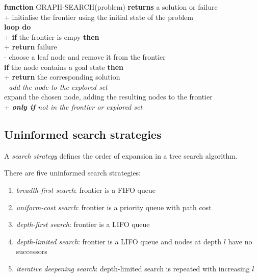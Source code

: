 \documentclass{article}
\begin{document}
\begin{pseudo}
\textbf{function} GRAPH-SEARCH(problem) \textbf{returns} a solution or failure  \\+
    initialise the frontier using the initial state of the problem              \\
    \textbf{loop do}                                                            \\+
        \textbf{if} the frontier is empy \textbf{then}                          \\+
            \textbf{return} failure                                             \\-
        choose a leaf node and remove it from the frontier                      \\
        \textbf{if} the node contains a goal state \textbf{then}                \\+
            \textbf{return} the corresponding solution                          \\-
        \emph{add the node to the explored set}                                 \\
        expand the chosen node, adding the resulting nodes to the frontier      \\+
            \emph{\textbf{only if} not in the frontier or explored set}
\end{pseudo}



\subsection{Uninformed search strategies}

\begin{definition}
    A \emph{search strategy} defines the order of expansion in a tree search algorithm.
\end{definition}

\begin{definition}[R\&N pp. 81-91]
    There are five uninformed search strategies:
    \begin{enumerate}
        \item \emph{breadth-first search}: frontier is a FIFO queue
        \item \emph{uniform-cost search}: frontier is a priority queue with path cost
        \item \emph{depth-first search}: frontier is a LIFO queue
        \item \emph{depth-limited search}: frontier is a LIFO queue and nodes at depth $l$ have no successors
        \item \emph{iterative deepening search}: depth-limited search is repeated with increasing $l$
    \end{enumerate}
\end{definition}
\end{document}
